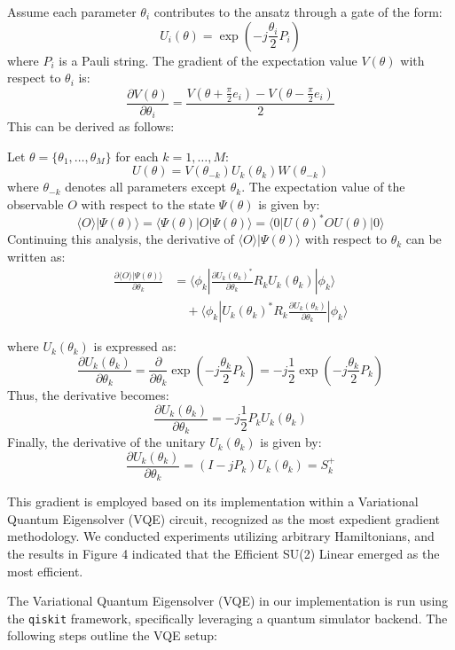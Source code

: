 \documentclass[%
 reprint,
 amsmath,amssymb,
 aps,
]{revtex4-2}
\begin{document}
Assume each parameter $\theta_i$ contributes to the ansatz through a gate of the form:
\[
U_i(\theta) = \exp\left(-j \frac{\theta_i}{2} P_i\right)
\]
where $P_i$ is a Pauli string. The gradient of the expectation value $V(\theta)$ with respect to $\theta_i$ is:
\[
\frac{\partial V(\theta)}{\partial \theta_i} = \frac{V\left(\theta + \frac{\pi}{2} e_i\right) - V\left(\theta - \frac{\pi}{2} e_i\right)}{2}
\]
This can be derived as follows:

Let $\theta = \{\theta_1, \dots, \theta_M\}$ for each $k = 1, \dots, M$:
\[
U(\theta) = V(\theta_{-k}) U_k(\theta_k) W(\theta_{-k})
\]
where $\theta_{-k}$ denotes all parameters except $\theta_k$. The expectation value of the observable $O$ with respect to the state $\Psi(\theta)$ is given by:
\[
\langle O \rangle | \Psi(\theta) \rangle = \langle \Psi(\theta) | O | \Psi(\theta) \rangle = \langle 0 | U(\theta)^* O U(\theta) | 0 \rangle
\]
Continuing this analysis, the derivative of $\langle O \rangle | \Psi(\theta) \rangle$ with respect to $\theta_k$ can be written as:
\begin{align}
\frac{\partial \langle O \rangle | \Psi(\theta) \rangle}{\partial \theta_k} &= \langle \phi_k | \frac{\partial U_k(\theta_k)^*}{\partial \theta_k} R_k U_k(\theta_k) | \phi_k \rangle \nonumber \\
&\quad + \langle \phi_k | U_k(\theta_k)^* R_k \frac{\partial U_k(\theta_k)}{\partial \theta_k} | \phi_k \rangle
\end{align}

where $U_k(\theta_k)$ is expressed as:
\[
\frac{\partial U_k(\theta_k)}{\partial \theta_k} = \frac{\partial}{\partial \theta_k} \exp\left(-j \frac{\theta_k}{2} P_k\right) = -j \frac{1}{2} \exp\left(-j \frac{\theta_k}{2} P_k\right)
\]
Thus, the derivative becomes:
\[
\frac{\partial U_k(\theta_k)}{\partial \theta_k} = -j \frac{1}{2} P_k U_k(\theta_k)
\]
Finally, the derivative of the unitary $U_k(\theta_k)$ is given by:
\[
\frac{\partial U_k(\theta_k)}{\partial \theta_k} = (I - j P_k) U_k(\theta_k) = S^+_k
\]

This gradient is employed based on its implementation within a Variational Quantum Eigensolver (VQE) circuit, recognized as the most expedient gradient methodology. We conducted experiments utilizing arbitrary Hamiltonians, and the results in Figure 4 indicated that the Efficient SU(2) Linear emerged as the most efficient.

The Variational Quantum Eigensolver (VQE) in our implementation is run using the \texttt{qiskit} framework, specifically leveraging a quantum simulator backend. The following steps outline the VQE setup:
\end{document}

